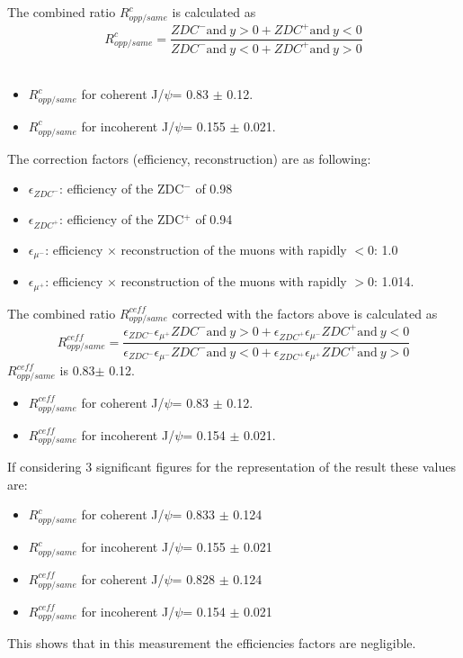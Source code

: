     The combined ratio $R_{opp/same}^{c}$ is calculated as \\
      $$ R_{opp/same}^{c} = \frac{ZDC^{-} \mbox{and}~y>0 + ZDC^{+} 
      \mbox{and}~y<0}{ZDC^{-} \mbox{and}~y<0 + ZDC^{+} \mbox{and}~y>0} $$\\
    \begin{itemize}
      \item $ R_{opp/same}^{c}$ for coherent J/$\psi$= 0.83 $\pm$ 0.12.
      \item $ R_{opp/same}^{c}$ for incoherent J/$\psi$= 0.155 $\pm$ 0.021.
    \end{itemize}
    
    The correction factors (efficiency, reconstruction) are as following: 
    \begin{itemize}
      \item $\epsilon_{ZDC^{-}}$: efficiency of the ZDC$^{-}$ of 0.98
      \item $\epsilon_{ZDC^{+}}$: efficiency of the ZDC$^{+}$ of 0.94\ 
      \item $\epsilon_{\mu^{-}}$: efficiency $\times$ reconstruction of the muons 
        with rapidly $<$0: 1.0 
      \item $\epsilon_{\mu^{+}}$: efficiency $\times$ reconstruction of the muons 
        with rapidly $>$0: 1.014. 
    \end{itemize}
    
    The combined ratio  $R_{opp/same}^{ceff}$ corrected with the factors  above is 
      calculated as \\
      $$ R_{opp/same}^{ceff} = \frac{\epsilon_{ZDC^{-}} \epsilon_{\mu^{+}} ZDC^{-} 
        \mbox{and}~y>0 + \epsilon_{ZDC^{+}} \epsilon_{\mu^{-}} ZDC^{+} 
        \mbox{and}~y<0}{\epsilon_{ZDC^{-}} \epsilon_{\mu^{-}} ZDC^{-} 
        \mbox{and}~y<0 + \epsilon_{ZDC^{+}} \epsilon_{\mu^{+}} ZDC^{+} 
        \mbox{and}~y>0} $$
      $R_{opp/same}^{ceff}$ is 0.83$\pm$ 0.12.    \\
    
    \begin{itemize}
      \item $ R_{opp/same}^{ceff}$ for coherent J/$\psi$= 0.83 $\pm$ 0.12.
      \item $ R_{opp/same}^{ceff} $ for incoherent J/$\psi$= 0.154 $\pm$ 0.021.
    \end{itemize}
    
    If considering 3 significant figures for the representation of the result these
      values are: 
    \begin{itemize}
      \item $ R_{opp/same}^{c}$ for coherent J/$\psi$= 0.833 $\pm$ 0.124
      \item $ R_{opp/same}^{c}$ for incoherent J/$\psi$= 0.155 $\pm$ 0.021
      \item $ R_{opp/same}^{ceff}$ for coherent J/$\psi$= 0.828 $\pm$ 0.124
      \item $ R_{opp/same}^{ceff} $ for incoherent J/$\psi$= 0.154 $\pm$ 0.021
    \end{itemize}
    
    This shows that in this measurement the efficiencies factors are negligible. 
